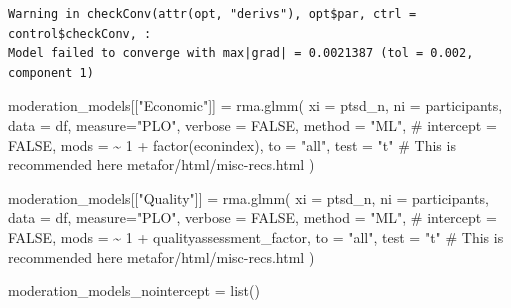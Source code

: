 \documentclass[
  letterpaper,
  DIV=11,
  numbers=noendperiod]{scrartcl}
\newenvironment{Shaded}{\begin{snugshade}}{\end{snugshade}}
\newcommand{\AttributeTok}[1]{\textcolor[rgb]{0.40,0.45,0.13}{#1}}
\newcommand{\CommentTok}[1]{\textcolor[rgb]{0.37,0.37,0.37}{#1}}
\newcommand{\ConstantTok}[1]{\textcolor[rgb]{0.56,0.35,0.01}{#1}}
\newcommand{\DecValTok}[1]{\textcolor[rgb]{0.68,0.00,0.00}{#1}}
\newcommand{\FunctionTok}[1]{\textcolor[rgb]{0.28,0.35,0.67}{#1}}
\newcommand{\NormalTok}[1]{\textcolor[rgb]{0.00,0.23,0.31}{#1}}
\newcommand{\OtherTok}[1]{\textcolor[rgb]{0.00,0.23,0.31}{#1}}
\newcommand{\SpecialCharTok}[1]{\textcolor[rgb]{0.37,0.37,0.37}{#1}}
\newcommand{\StringTok}[1]{\textcolor[rgb]{0.13,0.47,0.30}{#1}}
\begin{document}
\begin{verbatim}
Warning in checkConv(attr(opt, "derivs"), opt$par, ctrl = control$checkConv, :
Model failed to converge with max|grad| = 0.0021387 (tol = 0.002, component 1)
\end{verbatim}

\begin{Shaded}
\begin{Highlighting}[]
\NormalTok{moderation\_models[[}\StringTok{"Economic"}\NormalTok{]] }\OtherTok{=} \FunctionTok{rma.glmm}\NormalTok{(}
  \AttributeTok{xi =} \StringTok{\textasciigrave{}}\AttributeTok{ptsd\_n}\StringTok{\textasciigrave{}}\NormalTok{, }
  \AttributeTok{ni =} \StringTok{\textasciigrave{}}\AttributeTok{participants}\StringTok{\textasciigrave{}}\NormalTok{, }
  \AttributeTok{data =}\NormalTok{ df, }
  \AttributeTok{measure=}\StringTok{"PLO"}\NormalTok{,}
  \AttributeTok{verbose =} \ConstantTok{FALSE}\NormalTok{,}
  \AttributeTok{method =} \StringTok{"ML"}\NormalTok{,}
  \CommentTok{\# intercept = FALSE,}
  \AttributeTok{mods =} \SpecialCharTok{\textasciitilde{}} \DecValTok{1} \SpecialCharTok{+} \FunctionTok{factor}\NormalTok{(econindex),}
  \AttributeTok{to =} \StringTok{"all"}\NormalTok{,}
  \AttributeTok{test =} \StringTok{"t"} \CommentTok{\# This is recommended here metafor/html/misc{-}recs.html}
\NormalTok{)}

\NormalTok{moderation\_models[[}\StringTok{"Quality"}\NormalTok{]] }\OtherTok{=} \FunctionTok{rma.glmm}\NormalTok{(}
  \AttributeTok{xi =} \StringTok{\textasciigrave{}}\AttributeTok{ptsd\_n}\StringTok{\textasciigrave{}}\NormalTok{, }
  \AttributeTok{ni =} \StringTok{\textasciigrave{}}\AttributeTok{participants}\StringTok{\textasciigrave{}}\NormalTok{, }
  \AttributeTok{data =}\NormalTok{ df, }
  \AttributeTok{measure=}\StringTok{"PLO"}\NormalTok{,}
  \AttributeTok{verbose =} \ConstantTok{FALSE}\NormalTok{,}
  \AttributeTok{method =} \StringTok{"ML"}\NormalTok{,}
  \CommentTok{\# intercept = FALSE,}
  \AttributeTok{mods =} \SpecialCharTok{\textasciitilde{}} \DecValTok{1} \SpecialCharTok{+}\NormalTok{ qualityassessment\_factor,}
  \AttributeTok{to =} \StringTok{"all"}\NormalTok{,}
  \AttributeTok{test =} \StringTok{"t"} \CommentTok{\# This is recommended here metafor/html/misc{-}recs.html}
\NormalTok{)}

\NormalTok{moderation\_models\_nointercept }\OtherTok{=} \FunctionTok{list}\NormalTok{()}


\end{Highlighting}
\end{Shaded}
\end{document}
